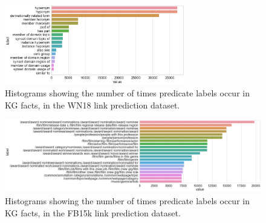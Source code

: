 \bigskip
\bigskip
\bigskip



\begin{figure}[H]
   	\centering
    	\includegraphics[width=0.7\textwidth, height=0.3\textheight]{WN18_Predicate_Counts}
	\caption{Histograms showing the number of times predicate labels occur in KG facts, in the WN18 link prediction dataset.}
\end{figure}

\begin{figure}[H]
   	\centering
    	\includegraphics[width=1.0\textwidth, height=0.3\textheight]{FB15k_Predicate_Counts}
	\captionsetup{justification=centering}
	\caption{Histograms showing the number of times predicate labels occur in KG facts, in the FB15k link prediction dataset.}
\end{figure}

\bigskip
\bigskip
\bigskip



